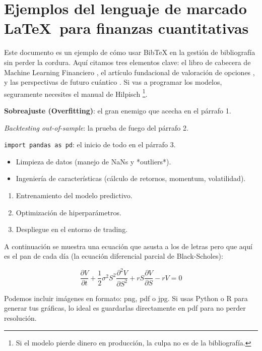 \section{Ejemplos del lenguaje de marcado \LaTeX\ para finanzas cuantitativas}
\label{cap:apendice}

Este documento es un ejemplo de cómo usar BibTeX en la gestión de bibliografía sin perder la cordura. Aquí citamos tres elementos clave: el libro de cabecera de Machine Learning Financiero \cite{lopezdeprado}, el artículo fundacional de valoración de opciones \cite{blackscholes}, y las perspectivas de futuro cuántico \cite{quantumfinance}.
Si vas a programar los modelos, seguramente necesites el manual de Hilpisch \cite{hilpisch}\footnote{Si el modelo pierde dinero en producción, la culpa no es de la bibliografía.}.

  \textbf{Sobreajuste (Overfitting)}: el gran enemigo que acecha en el párrafo 1.

  \textit{Backtesting out-of-sample}: la prueba de fuego del párrafo 2.

  \texttt{import pandas as pd}: el inicio de todo en el párrafo 3.

  \begin{itemize}
  \item Limpieza de datos (manejo de NaNs y *outliers*).
  \item Ingeniería de características (cálculo de retornos, momentum, volatilidad).
  \end{itemize}

  \vspace{0.5cm}

  \begin{enumerate}
  \item Entrenamiento del modelo predictivo.
  \item Optimización de hiperparámetros.
  \item Despliegue en el entorno de trading.
  \end{enumerate}

A continuación se muestra una ecuación que asusta a los de letras pero que aquí es el pan de cada día (la ecuación diferencial parcial de Black-Scholes):

  \[ \frac{\partial V}{\partial t} + \frac{1}{2}\sigma^2 S^2 \frac{\partial^2 V}{\partial S^2} + rS \frac{\partial V}{\partial S} - rV = 0 \]

  Podemos incluir imágenes en formato: png, pdf o jpg. Si usas Python o R para generar tus gráficas, lo ideal es guardarlas directamente en pdf para no perder resolución.

